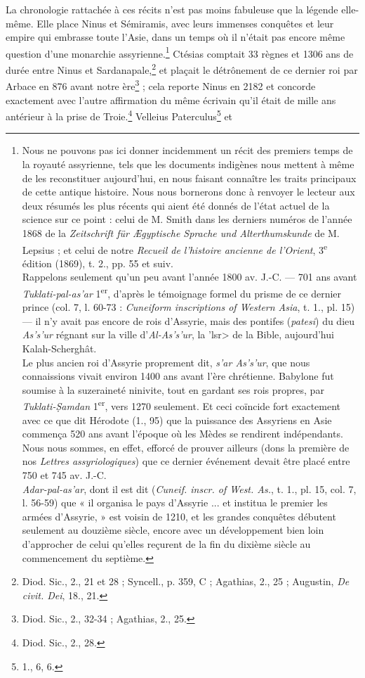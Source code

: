 \documentclass[a4paper, 11pt, oneside, landscape]{article}
\begin{document}
La chronologie rattachée à ces récits n'est pas moins fabuleuse que la légende elle-même. Elle place Ninus et Sémiramis, avec leurs immenses conquêtes et leur empire qui embrasse toute l'Asie, dans un temps où il n'était pas encore même question d'une monarchie assyrienne.\footnote{Nous ne pouvons pas ici donner incidemment un récit des premiers temps de la royauté assyrienne, tels que les documents indigènes nous mettent à même de les reconstituer aujourd'hui, en nous faisant connaître les traits principaux de cette antique histoire. Nous nous bornerons donc à renvoyer le lecteur aux deux résumés les plus récents qui aient été donnés de l'état actuel de la science sur ce point : celui de M. Smith dans les derniers numéros de l'année 1868 de la \emph{Zeitschrift für Ægyptische Sprache und Alterthumskunde} de M. Lepsius ; et celui de notre \emph{Recueil de l'histoire ancienne de l'Orient}, 3\textsuperscript{e} édition (1869), t. 2., pp. 55 et suiv.\\\hspace*{5mm}Rappelons seulement qu'un peu avant l'année 1800 av. J.-C. --- 701 ans avant \emph{Tuklati-pal-as'ar} 1\textsuperscript{er}, d'après le témoignage formel du prisme de ce dernier prince (col. 7, l. 60-73 : \emph{Cuneiform inscriptions of Western Asia}, t. 1., pl. 15) --- il n'y avait pas encore de rois d'Assyrie, mais des pontifes (\emph{patesi}) du dieu \emph{As's'ur} régnant sur la ville d'\emph{Al-As's'ur}, la \<'lsr> de la Bible, aujourd'hui Kalah-Scherghât.\\\hspace*{5mm}Le plus ancien roi d'Assyrie proprement dit, \emph{s'ar As's'ur}, que nous connaissions vivait environ 1400 ans avant l'ère chrétienne. Babylone fut soumise à la suzeraineté ninivite, tout en gardant ses rois propres, par \emph{Tuklati-\d{S}amdan} 1\textsuperscript{er}, vers 1270 seulement. Et ceci coïncide fort exactement avec ce que dit Hérodote (1., 95) que la puissance des Assyriens en Asie commença 520 ans avant l'époque où les Mèdes se rendirent indépendants. Nous nous sommes, en effet, efforcé de prouver ailleurs (dons la première de nos \emph{Lettres assyriologiques}) que ce dernier événement devait être placé entre 750 et 745 av. J.-C.\\\hspace*{5mm}\emph{Adar-pal-as'ar}, dont il est dit (\emph{Cuneif. inscr. of West. As.}, t. 1., pl. 15, col. 7, l. 56-59) que « il organisa le pays d'Assyrie ... et institua le premier les armées d'Assyrie, » est voisin de 1210, et les grandes conquêtes débutent seulement au douzième siècle, encore avec un développement bien loin d'approcher de celui qu'elles reçurent de la fin du dixième siècle au commencement du septième.} Ctésias comptait 33 règnes et 1306 ans de durée entre Ninus et Sardanapale,\footnote{Diod. Sic., 2., 21 et 28 ; Syncell., p. 359, C ; Agathias, 2., 25 ; Augustin, \emph{De civit. Dei}, 18., 21.} et plaçait le détrônement de ce dernier roi par Arbace en 876 avant notre ère\footnote{Diod. Sic., 2., 32-34 ; Agathias, 2., 25.} ; cela reporte Ninus en 2182 et concorde exactement avec l'autre affirmation du même écrivain qu'il était de mille ans antérieur à la prise de Troie.\footnote{Diod. Sic., 2., 28.} Velleius Paterculus\footnote{1., 6, 6.} et 
\end{document}
